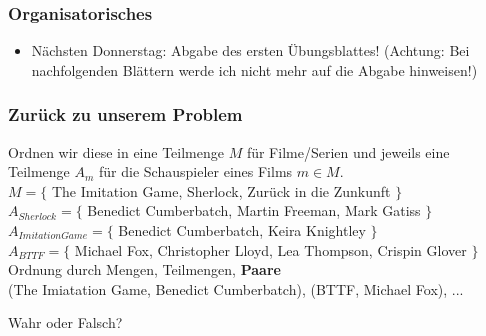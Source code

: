 




\graphicspath{{../figures/}}



\begin{frame}
	\frametitle{Organisatorisches}
	
	\begin{itemize}
		\item Nächsten Donnerstag: Abgabe des ersten Übungsblattes! (Achtung: Bei nachfolgenden Blättern werde ich nicht mehr auf die Abgabe hinweisen!)
	\end{itemize}
\end{frame}

\framePrevEpisode

\begin{frame}
	\frametitle{Zurück zu unserem Problem}
	Ordnen wir diese in eine Teilmenge $M$ für Filme/Serien und jeweils eine Teilmenge $A_m$ für die Schauspieler eines Films $m \in M$. \\[0.5em]
	$M = \{$ The Imitation Game, Sherlock, Zurück in die Zunkunft $\}$ \\[0.3em]
	$A_{Sherlock} = \{$ Benedict Cumberbatch, Martin Freeman, Mark Gatiss $\}$ \\
	$A_{Imitation Game} = \{$ Benedict Cumberbatch, Keira Knightley $\}$ \\
	$A_{BTTF} = \{$ Michael Fox, Christopher Lloyd, Lea Thompson, Crispin Glover $\}$ \\[2em]
	
	Ordnung durch Mengen, Teilmengen, \textbf{Paare}\\ \pause
	(The Imiatation Game, Benedict Cumberbatch), (BTTF, Michael Fox), ...
	
\end{frame}

\begin{frame}
	\begin{block}{Wahr oder Falsch?}
		\begin{itemize}
		\end{itemize}
	\end{block}

\end{frame}

